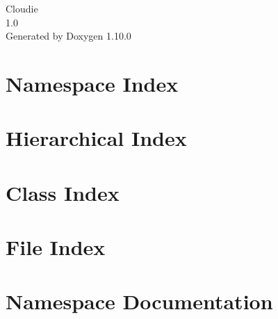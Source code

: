 \documentclass[twoside]{book}
\newcommand{\+}{\discretionary{\mbox{\scriptsize$\hookleftarrow$}}{}{}}
\newcommand{\clearemptydoublepage}{%
    \newpage{\pagestyle{empty}\cleardoublepage}%
  }
\begin{document}
  \raggedbottom
    \hypersetup{pageanchor=false,
                bookmarksnumbered=true,
                pdfencoding=unicode
               }
  \begin{titlepage}
  \vspace*{7cm}
  \begin{center}%
  {\Large Cloudie}\\
  [1ex]\large 1.\+0 \\
  \vspace*{1cm}
  {\large Generated by Doxygen 1.10.0}\\
  \end{center}
  \end{titlepage}
  \clearemptydoublepage
  \tableofcontents
  \clearemptydoublepage
  \hypersetup{pageanchor=true}

\chapter{Namespace Index}

\chapter{Hierarchical Index}

\chapter{Class Index}

\chapter{File Index}

\chapter{Namespace Documentation}








\end{document}
